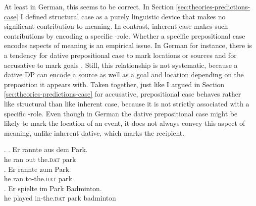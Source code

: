 \begin{sloppypar}
At least in German, this seems to be correct. In Section \ref{sec:theories-predictions-case} I defined structural case as a purely linguistic device that makes no significant contribution to meaning. In contrast, inherent case makes such contributions by encoding a specific \texttheta-role. Whether a specific prepositional case encodes aspects of meaning is an empirical issue. In German for instance, there is a tendency for dative prepositional case to mark locations or sources and for accusative to mark goals \citep[8]{zwarts2005}. Still, this relationship is not systematic, because a dative DP can encode a source \Next[a] as well as a goal \Next[b] and location \Next[c] depending on the preposition it appears with. Taken together, just like I argued in Section \ref{sec:theories-predictions-case} for accusative, prepositional case behaves rather like structural than like inherent case, because it is not strictly associated with a specific \texttheta-role. Even though in German the dative prepositional case might be likely to mark the location of an event, it does not always convey this aspect of meaning, unlike inherent dative, which marks the recipient.\end{sloppypar}\largerpage

\ex. \ag. Er rannte aus dem Park.\\
he ran  out the.\textsc{dat} park\\
  
\bg. Er rannte zum Park.\\
he ran to-the.\textsc{dat} park\\
 
\cg. Er spielte im Park Badminton.\\
he played in-the.\textsc{dat} park badminton\\


